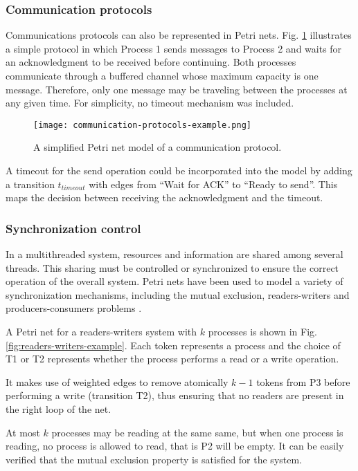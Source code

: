 \documentclass[../Thesis.tex]{subfiles}
\begin{document}
\subsubsection{Communication protocols}

Communications protocols can also be represented in Petri nets.
Fig. \ref{fig:communication-protocols-example} illustrates a simple protocol
in which Process 1 sends messages to Process 2 and waits for an acknowledgment to be received before continuing.
Both processes communicate through a buffered channel whose maximum capacity is one message.
Therefore, only one message may be traveling between the processes at any given time.
For simplicity, no timeout mechanism was included.

\begin{figure}[H]
    \centering
    \texttt{[image: communication-protocols-example.png]}
    \caption{A simplified Petri net model of a communication protocol.}
    \label{fig:communication-protocols-example}
\end{figure}

A timeout for the send operation could be incorporated into the model
by adding a transition $t_{timeout}$ with edges from ``Wait for ACK'' to ``Ready to send''.
This maps the decision between receiving the acknowledgment and the timeout.

\subsubsection{Synchronization control}

In a multithreaded system, resources and information are shared among several threads.
This sharing must be controlled or synchronized to ensure the correct operation of the overall system.
Petri nets have been used to model a variety of synchronization mechanisms,
including the mutual exclusion, readers-writers and producers-consumers problems \cite{murata1989}.

A Petri net for a readers-writers system with $k$ processes is shown in Fig. \ref{fig:readers-writers-example}.
Each token represents a process and the choice of T1 or T2
represents whether the process performs a read or a write operation.

It makes use of weighted edges to remove atomically
$k - 1$ tokens from P3 before performing a write (transition T2),
thus ensuring that no readers are present in the right loop of the net.

At most $k$ processes may be reading at the same same,
but when one process is reading, no process is allowed to read, that is P2 will be empty.
It can be easily verified that the mutual exclusion property is satisfied for the system.
\end{document}

